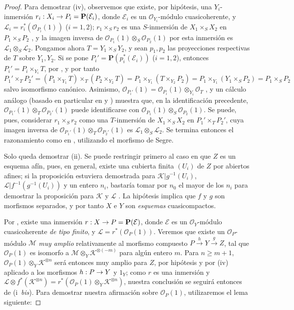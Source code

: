 \documentclass[oneside,10pt]{amsart}
\makeatletter
\renewcommand{\geq}{\geqslant}
\newcommand{\ega@arrow}[2]{\mathchoice{#1}{#2}{#2}{#2}}
\renewcommand{\to}{\ega@arrow{\longrightarrow}{\rightarrow}}
\makeatother
\begin{document}
\begin{proof}
Para demostrar (iv), observemos que existe, por hipótesis, una $Y_i$-inmersión $r_i:X_i\to P_i=\mathbf{P}(\mathcal{E}_i)$, donde $\mathcal{E}_i$ es un $\mathcal{O}_{Y_i}$-módulo cuasicoherente, y $\mathcal{L}_i=r_i^*(\mathcal{O}_{P_i}(1))$ ($i=1,2$);
$r_1\times_Sr_2$ es una $S$-inmersión de $X_1\times_SX_2$ en $P_1\times_SP_2$ , y la imagen inversa de $\mathcal{O}_{P_1}(1)\otimes_S\mathcal{O}_{P_2}(1)$ por esta inmersión es $\mathcal{L}_1\otimes_S\mathcal{L}_2$.
Pongamos ahora $T=Y_1\times_SY_2$, y sean $p_1,p_2$ las proyecciones respectivas de $T$ sobre $Y_1,Y_2$.
Si se pone $P_i'=\mathbf{P}(p_i^*(\mathcal{E}_i))$ ($i=1,2$), entonces $P_i'=P_i\times_{Y_i}T$, por , y por tanto
\[
  P_1'\times_TP_2'
  =(P_1\times_{Y_1}T)\times_T(P_2\times_{Y_2}T)
  =P_1\times_{Y_1}(T\times_{Y_2}P_2)
  =P_1\times_{Y_1}(Y_1\times_SP_2)
  =P_1\times_SP_2
\]
salvo isomorfismo canónico.
Asimismo, $\mathcal{O}_{P_i'}(1)=\mathcal{O}_{P_i}(1)\otimes_{Y_i}\mathcal{O}_T$ , y un cálculo análogo (basado en particular en  y ) muestra que, en la identificación precedente, $\mathcal{O}_{P_1'}(1)\otimes_T\mathcal{O}_{P_2'}(1)$ puede identificarse con $\mathcal{O}_{P_1}(1)\otimes_S\mathcal{O}_{P_2}(1)$.
Se puede, pues, considerar $r_1\times_Sr_2$ como una $T$-inmersión de $X_1\times_SX_2$ en $P_1'\times_TP_2'$, cuya imagen inversa de $\mathcal{O}_{P_1'}(1)\otimes_T\mathcal{O}_{P_2'}(1)$ es $\mathcal{L}_1\otimes_S\mathcal{L}_2$.
Se termina entonces el razonamiento como en , utilizando el morfismo de Segre.

Solo queda demostrar (ii).
Se puede restringir primero al caso en que $Z$ es un esquema afín, pues, en general, existe una cubierta finita $(U_i)$ de $Z$ por abiertos afines;
si la proposición estuviera demostrada para $\mathcal{K}|g^{-1}(U_i)$, $\mathcal{L}|f^{-1}(g^{-1}(U_i))$ y un entero $n_i$, bastaría tomar por $n_0$ el mayor de los $n_i$ para demostrar la proposición para $\mathcal{K}$ y $\mathcal{L}$ .
La hipótesis implica que $f$ y $g$ son morfismos separados, y por tanto $X$ e $Y$ son \emph{esquemas} cuasicompactos.

Por , existe una inmersión $r:X\to P=\mathbf{P}(\mathcal{E})$, donde $\mathcal{E}$ es un $\mathcal{O}_Y$-módulo cuasicoherente \emph{de tipo finito}, y $\mathcal{L}=r^*(\mathcal{O}_P(1))$.
Veremos que existe un $\mathcal{O}_P$-módulo $\mathcal{M}$ \emph{muy amplio} relativamente al morfismo compuesto $P\xrightarrow{h}Y\xrightarrow{g}Z$, tal que $\mathcal{O}_P(1)$ es isomorfo a $\mathcal{M}\otimes_Y\mathcal{K}^{\otimes(-m)}$ para algún entero $m$.
Para $n\geq m+1$, $\mathcal{O}_P(1)\otimes_Y\mathcal{K}^{\otimes n}$ será entonces muy amplio para $Z$, por hipótesis y por (iv) aplicado a los morfismos $h:P\to Y$ y $1_Y$;
como $r$ es una inmersión y $\mathcal{L}\otimes f^*(\mathcal{K}^{\otimes n})
=r^*(\mathcal{O}_P(1)\otimes_Y\mathcal{K}^{\otimes n})$, nuestra conclusión se seguirá entonces de (i~\emph{bis}).
Para demostrar nuestra afirmación sobre $\mathcal{O}_P(1)$, utilizaremos el lema siguiente:


\end{proof}
\end{document}
